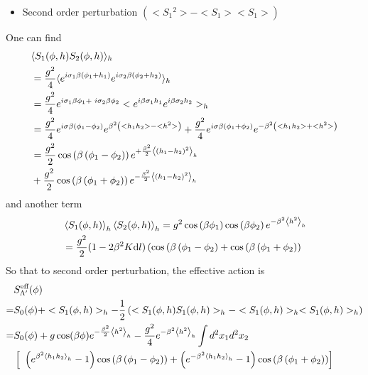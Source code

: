 \documentclass[submission, PhysLectNotes]{SciPost}
\begin{document}
\begin{itemize}
	\item Second order perturbation \(\left(<S_1{}^2>-<S_1><S_1> \right)\) 
\end{itemize}
One can find
\begin{equation}
	\begin{aligned}
		&\langle S_1(\phi ,h)S_2(\phi ,h)\rangle_h \\
		&=\frac{g^2}{4} \langle e^{i \sigma _1 \beta  \left( \phi _1 +h_1\right)}e^{i \sigma _2 \beta  \left(\phi _2 +h_2\right)}\rangle_{h } \\
		&= \frac{g^2 }{4} e^{i \sigma _1 \beta  \phi _1 +\text{  }i \sigma _2 \beta  \phi _2 }< e^{i \beta\sigma _1 h_1}e^{i \beta\sigma _2 h_2}>_{h }\\
		&=\frac{g^2 }{4}e^{i \sigma  \beta  \left(\phi _1 - \phi _2\right) }e^{\beta ^2 \left( <h_1h_2>-<h^2> \right)} +\frac{g^2}{4}e^{i \sigma  \beta  \left(\phi _1 + \phi _2\right) }e^{-\beta ^2 \left( <h_1h_2>+<h^2> \right)}\\
		&= \frac{g^2 }{2}\cos \left(\beta  \left(\phi _1 - \phi _2\right) \right){} e^{+\frac{\beta^2}{2}  \expval{\left(h_1-h_2\right)^2}_h} \\
		&+\frac{g^2}{2} \cos \left(\beta  \left(\phi _1 + \phi _2\right) \right){} e^{-\frac{\beta^2}{2}  \expval{\left(h_1-h_2\right)^2}_h}
	\end{aligned}
\end{equation}
and another term
\begin{equation}
	\begin{aligned}
		&\expval{S_1(\phi ,h)}_h \expval{S_2(\phi ,h)}_h = g^2 \cos \left( \beta  \phi _1\right) \cos \left(\beta \phi _2\right) e^{-\beta ^2 \expval{h^2}_h}\\
		&= \frac{g^2 }{2}(1 - 2\beta^2 K \text{d}l) \left( \cos \left( \beta  \left(\phi _1 - \phi _2\right) + \cos \left( \beta  \left(\phi _1 + \phi _2\right) \right)\right.\right.		
	\end{aligned}
\end{equation}
So that to second order perturbation, the effective action is
\begin{equation}
	\begin{aligned}
		&S_{\Lambda '}^{\text{eff}} ( \phi  ) \\
		=& S_0(\phi ) +<S_1(\phi ,h)>_h - \frac{1}{2}\left(<S_1(\phi ,h)S_1(\phi ,h)>_h - <S_1(\phi ,h)>_h<S_1(\phi ,h)>_h\right)\\
		=& S_0( \phi  ) + g \cos  (\beta  \phi ) e^{-\frac{\beta ^2}{2} \expval{h^2}_h} - \frac{ g^2 }{4}e^{-\beta ^2 \expval{h^2}_h}\int d^2x_1d^2x_2 \\
		& \left[\text{  }\left( e^{\beta
		^2 \expval{h_1h_2}_h}-1\right) \cos \left( \beta  \left(\phi _1 - \phi _2\right) \right)+ \left( e^{-\beta ^2 \expval{h_1h_2}_h}-1\right) \cos \left( \beta  \left(\phi _1 + \phi _2\right) \right) \right]
	\end{aligned}
\end{equation}
\end{document}
